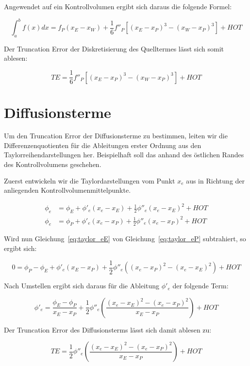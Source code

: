 \documentclass[ngerman,colorback,accentcolor=tud2d]{tudreport}
\begin{document}
Angewendet auf ein Kontrollvolumen ergibt sich daraus die folgende Formel:

\begin{equation*}
  \int_a^b f(x)dx = f_P(x_E-x_W) + \frac{1}{6} f''_P \left[{{(x_E-x_P)}^3-{(x_W-x_P)}^3}\right] + HOT
\end{equation*}

Der Truncation Error der Diskretisierung des Quelltermes lässt sich somit ablesen:

\begin{equation}
  TE = \frac{1}{6} f''_P \left[{{(x_E-x_P)}^3-{(x_W-x_P)}^3}\right] + HOT
\end{equation}

\section{Diffusionsterme}
\label{sec:Diffusionsterme}


Um den Truncation Error der Diffusionsterme zu bestimmen, leiten wir die Differenzenquotienten
für die Ableitungen erster Ordnung aus den Taylorreihendarstellungen her. Beispielhaft
soll das anhand des östlichen Randes des Kontrollvolumens geschehen.

Zuerst entwickeln wir die Taylordarstellungen vom Punkt $x_e$ aus in Richtung der anliegenden
Kontrollvolumenmittelpunkte.

\begin{align}
  \phi_e &= \phi_E + \phi'_e(x_e-x_E)+\frac{1}{2}\phi''_e(x_e-x_E)^2+HOT
  \label{eq:taylor_eE}\\
  \phi_e &= \phi_P + \phi'_e(x_e-x_P)+\frac{1}{2}\phi''_e(x_e-x_P)^2+HOT
  \label{eq:taylor_eP}
\end{align}

Wird nun Gleichung~\ref{eq:taylor_eE} von Gleichung~\ref{eq:taylor_eP} subtrahiert, 
so ergibt sich:

\begin{equation*}
  0 = \phi_P-\phi_E+\phi'_e(x_E-x_P)+
  \frac{1}{2}\phi''_e\left({{(x_e-x_P)}^2-{(x_e-x_E)}^2}\right)+HOT
\end{equation*}

Nach Umstellen ergibt sich daraus für die Ableitung $\phi'_e$ der folgende Term:

\begin{equation}
  \phi'_e = \frac{\phi_E-\phi_P}{x_E-x_P}+\frac{1}{2}\phi''_e
\left({\frac{{(x_e-x_E)}^2-{(x_e-x_P)}^2}{x_E-x_P}}\right)+HOT
\end{equation}

Der Truncation Error des Diffusionsterms lässt sich damit ablesen zu:

\begin{equation*}
  TE = \frac{1}{2}\phi''_e \left({\frac{{(x_e-x_E)}^2-{(x_e-x_P)}^2}{x_E-x_P}}\right)+HOT
\end{equation*}
\end{document}
